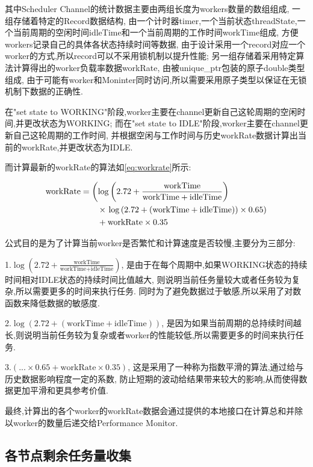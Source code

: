 \documentclass{mproj}
\begin{document}
其中Scheduler Channel的统计数据主要由两组长度为workers数量的数组组成,
一组存储着特定的Record数据结构,
由一个计时器timer,一个当前状态threadState,一个当前周期的空闲时间idleTime和一个当前周期的工作时间workTime组成,
方便workers记录自己的具体各状态持续时间等数据,
由于设计采用一个record对应一个worker的方式,所以record可以不采用锁机制以提升性能;
另一组存储着采用特定算法计算得出的worker负载率数据workRate,
由被unique\_ptr包装的原子double类型组成,
由于可能有worker和Moninter同时访问,所以需要采用原子类型以保证在无锁机制下数据的正确性.

在"set state to WORKING"阶段,worker主要在channel更新自己这轮周期的空闲时间,并更改状态为WORKING;
而在"set state to IDLE"阶段,worker主要在channel更新自己这轮周期的工作时间,
并根据空闲与工作时间与历史workRate数据计算出当前的workRate,并更改状态为IDLE.

而计算最新的workRate的算法如\cref{eq:workrate}所示:

\begin{align}
    \text{workRate} & = \left( \log\left( 2.72 + \frac{\text{workTime}}{\text{workTime} + \text{idleTime}} \right) \right. \notag   \\
                    & \qquad \times \left. \log\left( 2.72 + (\text{workTime} + \text{idleTime}) \right) \times 0.65 \right) \notag \\
                    & \qquad + \text{workRate} \times 0.35 \label{eq:workrate}
\end{align}

公式目的是为了计算当前worker是否繁忙和计算速度是否较慢,主要分为三部分:

1.$\log\left( 2.72 + \frac{\text{workTime}}{\text{workTime} + \text{idleTime}} \right)$,
是由于在每个周期中,如果WORKING状态的持续时间相对IDLE状态的持续时间比值越大,
则说明当前任务量较大或者任务较为复杂,所以需要更多的时间来执行任务.
同时为了避免数据过于敏感,所以采用了对数函数来降低数据的敏感度.

2.$\log\left( 2.72 + (\text{workTime} + \text{idleTime}) \right)$,
是因为如果当前周期的总持续时间越长,则说明当前任务较为复杂或者worker的性能较低,所以需要更多的时间来执行任务.

3.$(... \times 0.65 +\text{workRate} \times 0.35)$,
这是采用了一种称为指数平滑的算法,通过给与历史数据影响程度一定的系数,
防止短期的波动给结果带来较大的影响,从而使得数据更加平滑和更具参考价值.

最终,计算出的各个worker的workRate数据会通过提供的本地接口在计算总和并除以worker的数量后递交给Performance Monitor.

\subsection{各节点剩余任务量收集}
\end{document}
